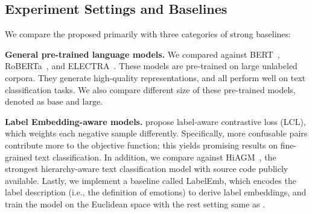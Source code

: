 



\subsection{Experiment Settings and Baselines}
We compare the proposed \wsmodelname primarily with three categories of strong
baselines:

\noindent\textbf{General pre-trained language models.} 
We compared against BERT~\cite{devlin-etal-2019-bert}, RoBERTa~\cite{roberta},
and ELECTRA~\cite{clark2020electra}. These models are pre-trained on large unlabeled corpora. They generate high-quality representations, and all perform well on text classification tasks. We also compare different size of these pre-trained models, denoted as $\mathrm{base}$ and $\mathrm{large}$.

\noindent\textbf{Label Embedding-aware models.}
\citet{suresh-ong-2021-negatives} propose label-aware contrastive loss (LCL),
which weights each negative sample differently. Specifically, more confusable pairs contribute more to the objective function; this yields promising results on fine-grained text classification.
In addition, we compare against HiAGM~\cite{jie2020hierarchy}, the strongest hierarchy-aware text classification model with source code publicly available.
Lastly, we implement a baseline called LabelEmb, which encodes the label description (i.e., the definition of emotions) to derive label embeddings, and train the model on the Euclidean space with the rest setting same as \modelname.

